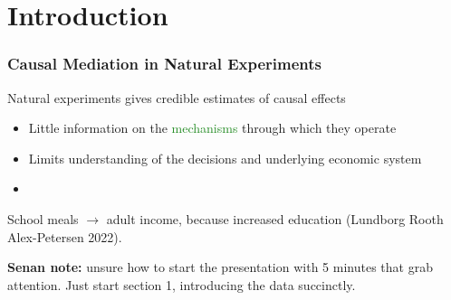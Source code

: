 \documentclass[dvipsnames,handout]{beamer} %
\begin{document}
\section{Introduction}
\begin{frame}
    \frametitle{Causal Mediation in Natural Experiments}
    Natural experiments gives credible estimates of causal effects
    \begin{itemize}
        \item Little information on the \textcolor{ForestGreen}{mechanisms} through which they operate
        \item Limits understanding of the decisions and underlying economic system
        \item  
    \end{itemize}

    School meals $\to$ adult income, because increased education 
    (Lundborg Rooth Alex-Petersen 2022).

    \textbf{Senan note:} unsure how to start the presentation with 5 minutes that grab attention.
    Just start section 1, introducing the data succinctly.
\end{frame}
\end{document}
